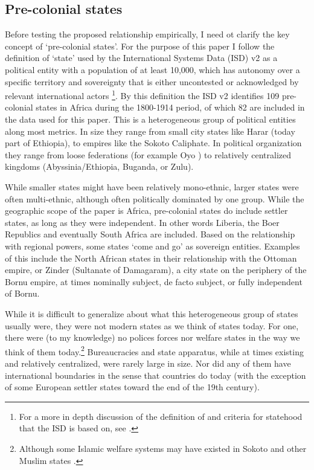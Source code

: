 \documentclass[12pt]{article}
\begin{document}
\subsection{Pre-colonial states} \label{Pre-colonial states}

Before testing the proposed relationship empirically, I need ot clarify the key
concept of `pre-colonial states'. For the purpose of this paper I follow the
definition of `state' used by the International Systems Data (ISD) v2
\citep{Butcher2020} as a political entity with a population of at least 10,000,
which has autonomy over a specific territory and sovereignty that is either
uncontested or acknowledged by relevant international actors
\citep{Butcher2020}\footnote{For a more in depth discussion of the definition of
and criteria for statehood that the ISD is based on, see \citet{Butcher2017}.}.
By this definition the ISD v2 identifies 109 pre-colonial states in Africa
during the 1800-1914 period, of which 82 are included in the data used for this
paper. This is a heterogeneous group of political entities along most metrics.
In size they range from small city states like Harar (today part of Ethiopia),
to empires like the Sokoto Caliphate. In political organization they range from
loose federations (for example Oyo \citep{Law1977}) to relatively centralized
kingdoms (Abyssinia/Ethiopia, Buganda, or Zulu).

While smaller states might have been relatively mono-ethnic, larger states were
often multi-ethnic, although often politically dominated by one group. While the
geographic scope of the paper is Africa, pre-colonial states do include settler
states, as long as they were independent. In other words Liberia, the Boer
Republics and eventually South Africa are included. Based on the relationship
with regional powers, some states `come and go' as sovereign entities. Examples
of this include the North African states in their relationship with the Ottoman
empire, or Zinder (Sultanate of Damagaram), a city state on the periphery of the
Bornu empire, at times nominally subject, de facto subject, or fully independent
of Bornu.

While it is difficult to generalize about what this heterogeneous group of
states usually were, they were not modern states as we think of states today.
For one, there were (to my knowledge) no polices forces nor welfare states in
the way we think of them today.\footnote{Although some Islamic welfare systems
may have existed in Sokoto \citep{Buba_2018} and other Muslim states
\citep{WeissHolger2002SwiM}.} Bureaucracies and state apparatus, while at times
existing and relatively centralized, were rarely large in size. Nor did
any of them have international boundaries in the sense that countries do today
(with the exception of some European settler states toward the end of the 19th
century). 
\end{document}
